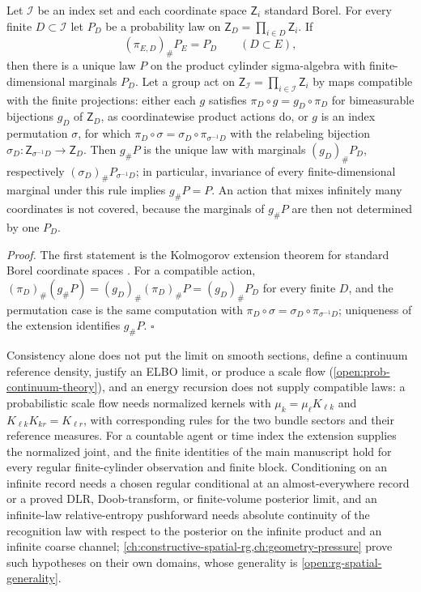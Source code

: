 Let \(\mathcal I\) be an index set and each coordinate space \(\mathsf Z_i\)
standard Borel. For every finite \(D\subset\mathcal I\) let \(P_D\) be a
probability law on \(\mathsf Z_D=\prod_{i\in D}\mathsf Z_i\). If
\begin{equation}
(\pi_{E,D})_\#P_E=P_D\qquad(D\subset E),
\label{eq:cg-projective-consistency}
\end{equation}
then there is a unique law \(P\) on the product cylinder sigma-algebra with
finite-dimensional marginals \(P_D\). Let a group act on
\(\mathsf Z_{\mathcal I}=\prod_{i\in\mathcal I}\mathsf Z_i\) by maps compatible
with the finite projections: either each \(g\) satisfies
\(\pi_D\circ g=g_D\circ\pi_D\) for bimeasurable bijections \(g_D\) of
\(\mathsf Z_D\), as coordinatewise product actions do, or \(g\) is an index
permutation \(\sigma\), for which
\(\pi_D\circ\sigma=\sigma_D\circ\pi_{\sigma^{-1}D}\) with the relabeling
bijection \(\sigma_D:\mathsf Z_{\sigma^{-1}D}\to\mathsf Z_D\). Then \(g_\#P\) is
the unique law with marginals \((g_D)_\#P_D\), respectively
\((\sigma_D)_\#P_{\sigma^{-1}D}\); in particular, invariance of every
finite-dimensional marginal under this rule implies \(g_\#P=P\). An action that
mixes infinitely many coordinates is not covered, because the marginals of
\(g_\#P\) are then not determined by one \(P_D\). 

\noindent\emph{Proof.}
The first statement is the Kolmogorov extension theorem for standard Borel
coordinate spaces \citep{Kallenberg2021}. For a compatible action,
\((\pi_D)_\#(g_\#P)=(g_D)_\#(\pi_D)_\#P=(g_D)_\#P_D\) for every finite \(D\),
and the permutation case is the same computation with
\(\pi_D\circ\sigma=\sigma_D\circ\pi_{\sigma^{-1}D}\); uniqueness of the
extension identifies \(g_\#P\). \(\square\)

Consistency alone does not put the limit on smooth sections, define a
continuum reference density, justify an ELBO limit, or produce a scale flow
(\cref{open:prob-continuum-theory}), and an energy recursion does not supply
compatible laws: a probabilistic scale flow needs normalized kernels with
\(\mu_k=\mu_\ell K_{\ell k}\) and \(K_{\ell k}K_{kr}=K_{\ell r}\), with
corresponding rules for the two bundle sectors and their reference measures.
For a countable agent or time index the extension supplies the normalized
joint, and the finite identities of the main manuscript hold for every regular
finite-cylinder observation and finite block. Conditioning on an infinite
record needs a chosen regular conditional at an almost-everywhere record or a
proved DLR, Doob-transform, or finite-volume posterior limit, and an
infinite-law relative-entropy pushforward needs absolute continuity of the
recognition law with respect to the posterior on the infinite product and an
infinite coarse channel; \cref{ch:constructive-spatial-rg,ch:geometry-pressure}
prove such hypotheses on their own domains, whose generality is
\cref{open:rg-spatial-generality}.

